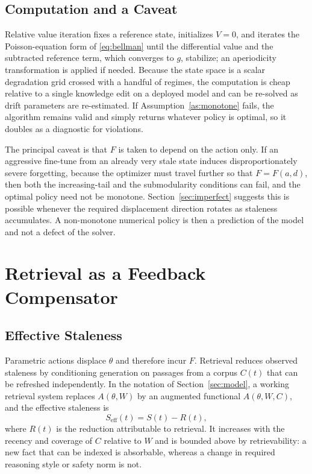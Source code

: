 \documentclass[journal]{IEEEtran}
\begin{document}
\subsection{Computation and a Caveat}
Relative value iteration fixes a reference state, initializes $V=0$, and iterates the Poisson-equation form of \eqref{eq:bellman} until the differential value and the subtracted reference term, which converges to $g$, stabilize; an aperiodicity transformation is applied if needed. Because the state space is a scalar degradation grid crossed with a handful of regimes, the computation is cheap relative to a single knowledge edit on a deployed model and can be re-solved as drift parameters are re-estimated. If Assumption~\ref{as:monotone} fails, the algorithm remains valid and simply returns whatever policy is optimal, so it doubles as a diagnostic for violations.

The principal caveat is that $F$ is taken to depend on the action only. If an aggressive fine-tune from an already very stale state induces disproportionately severe forgetting, because the optimizer must travel further so that $F=F(a,d)$, then both the increasing-tail and the submodularity conditions can fail, and the optimal policy need not be monotone. Section~\ref{sec:imperfect} suggests this is possible whenever the required displacement direction rotates as staleness accumulates. A non-monotone numerical policy is then a prediction of the model and not a defect of the solver.

\section{Retrieval as a Feedback Compensator}\label{sec:rag}
\subsection{Effective Staleness}
Parametric actions displace $\theta$ and therefore incur $F$. Retrieval reduces observed staleness by conditioning generation on passages from a corpus $C(t)$ that can be refreshed independently. In the notation of Section~\ref{sec:model}, a working retrieval system replaces $A(\theta,W)$ by an augmented functional $A(\theta,W,C)$, and the effective staleness is
\begin{equation}
S_{\mathrm{eff}}(t)=S(t)-R(t),
\end{equation}
where $R(t)$ is the reduction attributable to retrieval. It increases with the recency and coverage of $C$ relative to $W$ and is bounded above by retrievability: a new fact that can be indexed is absorbable, whereas a change in required reasoning style or safety norm is not.
\end{document}
